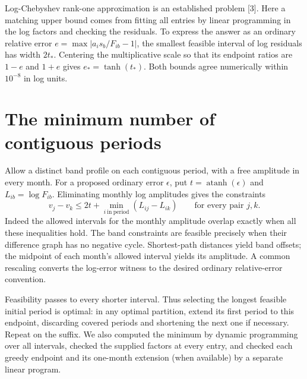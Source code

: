 \documentclass[10pt]{article}
\begin{document}
Log-Chebyshev rank-one approximation is an established problem [3]. Here a matching upper bound comes from fitting all entries by linear programming in the log factors and checking the residuals. To express the answer as an ordinary relative error $e=\max|a_i s_b/F_{ib}-1|$, the smallest feasible interval of log residuals has width $2t_*$. Centering the multiplicative scale so that its endpoint ratios are $1-e$ and $1+e$ gives $e_*=\tanh(t_*)$. Both bounds agree numerically within $10^{-8}$ in log units.
\newpage
\section{The minimum number of contiguous periods}
Allow a distinct band profile on each contiguous period, with a free amplitude in every month. For a proposed ordinary error $\epsilon$, put $t=\operatorname{atanh}(\epsilon)$ and $L_{ib}=\log F_{ib}$. Eliminating monthly log amplitudes gives the constraints
\[
 v_j-v_k \leq 2t + \min_{i\ \mathrm{in\ period}}(L_{ij}-L_{ik})\qquad\text{for every pair } j,k .
\]
Indeed the allowed intervals for the monthly amplitude overlap exactly when all these inequalities hold. The band constraints are feasible precisely when their difference graph has no negative cycle. Shortest-path distances yield band offsets; the midpoint of each month's allowed interval yields its amplitude. A common rescaling converts the log-error witness to the desired ordinary relative-error convention.

Feasibility passes to every shorter interval. Thus selecting the longest feasible initial period is optimal: in any optimal partition, extend its first period to this endpoint, discarding covered periods and shortening the next one if necessary. Repeat on the suffix. We also computed the minimum by dynamic programming over all intervals, checked the supplied factors at every entry, and checked each greedy endpoint and its one-month extension (when available) by a separate linear program.
\end{document}

